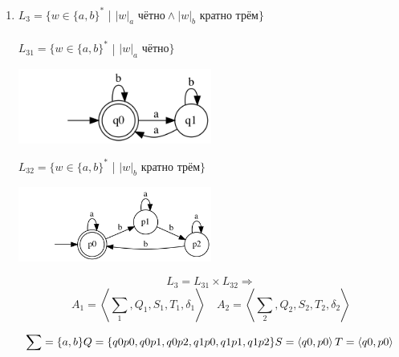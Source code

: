 \documentclass{article}
\begin{document}
\begin{enumerate}
\item {$L_3 = \{w \in \{a,b\}^* $ | $ |w|_a \text{ чётно} \wedge |w|_b \text{ кратно трём} \} $} \\ \\
$L_{31} = \{w \in \{a,b\}^* $ | $ |w|_a \text{ чётно} \} $\\
\begin{center}
    \includegraphics[width=0.5\textwidth]{g231.png}
\end{center}
$L_{32} = \{w \in \{a,b\}^* $ | $ |w|_b \text{ кратно трём} \} $\\
\begin{center}
    \includegraphics[width=0.5\textwidth]{g232.png}
\end{center}

\begin{center}
\[
    L_3 = L_{31} \times L_{32} \Rightarrow \]
    \[A_1 = \left\langle \sum_{1} , Q_1, S_1, T_1, \delta_1\right\rangle \quad 
    A_2 = \left\langle \sum_{2}, Q_2, S_2, T_2, \delta_2\right\rangle
\]

\[
    \sum = \{a, b\} \\
    Q = \{q0p0, q0p1, q0p2, q1p0, q1p1, q1p2\} \\
    S = \left\langle q0,p0 \right\rangle \\
    T = \left\langle q0,p0 \right\rangle \\
\]


\end{center}
\end{enumerate}
\end{document}
